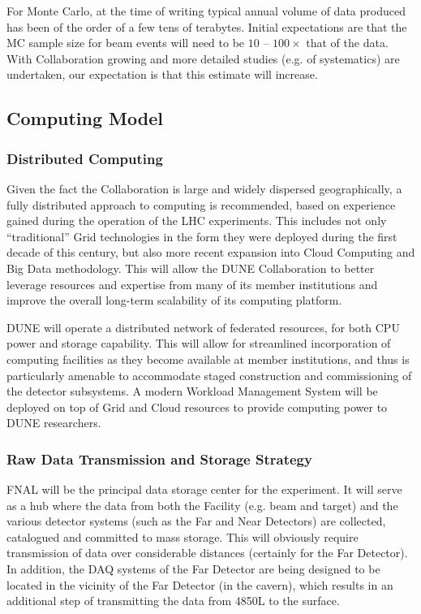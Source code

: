 For Monte Carlo, at the time of writing typical annual volume of data produced has been of the order of a few tens of terabytes.
Initial expectations are that the MC sample size for beam events will
need to be $10$ -- $100\times$ that of the data.
With Collaboration growing
and more detailed studies (e.g. of systematics) are undertaken, our
expectation is that this estimate will increase.

\subsection{Computing Model}
\label{sec:detectors-sc-infrastructure-computing-model}

\subsubsection{Distributed Computing}

Given the fact the Collaboration is large and widely dispersed geographically, a fully distributed approach to computing is recommended, based on experience
gained during the operation of the LHC experiments. This includes not only ``traditional'' Grid technologies in the form they were deployed during the first
decade of this century, but also more recent expansion into Cloud Computing
and Big Data methodology. This will allow the DUNE Collaboration to better leverage resources and expertise from many of its
member institutions and improve the overall long-term scalability of its computing platform.

DUNE will operate a  distributed network of federated resources, for both CPU power and storage capability. This will allow for streamlined incorporation
of computing facilities as they become available at member institutions, and thus is particularly amenable to accommodate staged construction and commissioning
of the detector subsystems. A modern Workload Management System will be deployed on top of Grid and Cloud resources to provide computing
power to DUNE researchers.

\subsubsection{Raw Data Transmission and Storage Strategy}
FNAL will be the principal data storage center for the experiment. It will serve as a hub where the data from both the Facility (e.g. beam and target)
and the various detector systems (such as the  Far and Near Detectors)  are collected, catalogued and committed to mass storage. This will obviously require transmission of
data over considerable distances (certainly for the Far Detector). In addition, the DAQ systems of the Far Detector are being designed to be located  in the vicinity of
the Far Detector (in the cavern), which results in an additional step of transmitting the data from 4850L to the surface.

